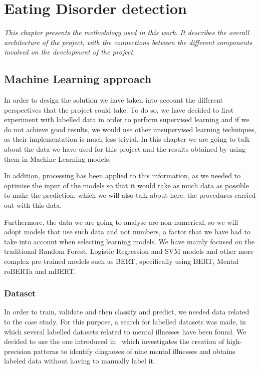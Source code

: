 \chapter{Eating Disorder detection}
\label{chap:architecture}
\textit{This chapter presents the methodology used in this work. It describes the overall architecture of the project, with the connections between the different components involved on the development of the project.}

\clearpage
\section{Machine Learning approach}
In order to design the solution we have taken into account the different perspectives that the project could take. To do so, we have decided to first experiment with labelled data in order to perform supervised learning and if we do not achieve good results, we would use other unsupervised learning techniques, as their implementation is much less trivial. In this chapter we are going to talk about the data we have used for this project and the results obtained by using them in Machine Learning models.

In addition, processing has been applied to this information, as we needed to optimise the input of the models so that it would take as much data as possible to make the prediction, which we will also talk about here, the procedures carried out with this data.

Furthermore, the data we are going to analyse are non-numerical, so we will adopt models that use such data and not numbers, a factor that we have had to take into account when selecting learning models. We have mainly focused on the traditional Random Forest, Logistic Regression and SVM models and other more complex pre-trained models such as BERT, specifically using BERT, Mental roBERTa and mBERT.


\subsection{Dataset}
\label{sec:dataset}
In order to train, validate and then classify and predict, we needed data related to the case study. For this purpose, a search for labelled datasets was made, in which several labelled datasets related to mental illnesses have been found. We decided to use the one introduced in~\cite{https://doi.org/10.48550/arxiv.1806.05258} which investigates the creation of high-precision patterns to identify diagnoses of nine mental illnesses and obtains labeled data without having to manually label it.

